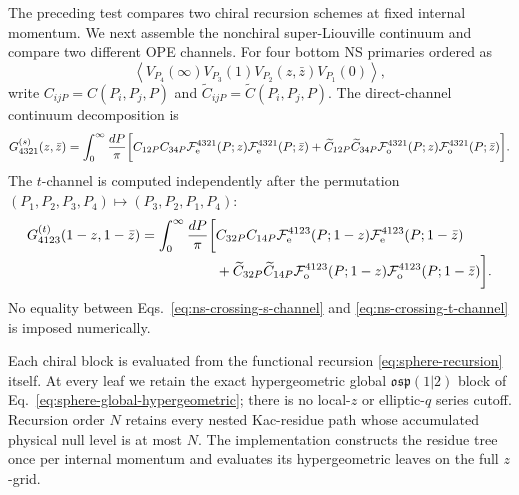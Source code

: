 \documentclass[11pt]{article}
\newcommand{\osp}{\mathfrak{osp}(1|2)}
\newcommand{\F}{\mathcal F}
\begin{document}
The preceding test compares two chiral recursion schemes at fixed internal
momentum.  We next assemble the nonchiral super-Liouville continuum and
compare two different OPE channels.  For four bottom NS primaries ordered as
\begin{equation}
 \left\langle
 V_{P_4}(\infty)V_{P_3}(1)V_{P_2}(z,\bar z)V_{P_1}(0)
 \right\rangle,
 \label{eq:ns-crossing-ordered-correlator}
\end{equation}
write \(C_{ijP}=C(P_i,P_j,P)\) and
\(\widetilde C_{ijP}=\widetilde C(P_i,P_j,P)\).  The direct-channel
continuum decomposition is
\begin{align}
 G_{4321}^{(s)}(z,\bar z)
 =\int_0^\infty\frac{dP}{\pi}\bigg[
  C_{12P}C_{34P}
  \F_{\rm e}^{4321}(P;z)\F_{\rm e}^{4321}(P;\bar z)
  +\widetilde C_{12P}\widetilde C_{34P}
  \F_{\rm o}^{4321}(P;z)\F_{\rm o}^{4321}(P;\bar z)
 \bigg].
 \label{eq:ns-crossing-s-channel}
\end{align}
The \(t\)-channel is computed independently after the permutation
\((P_1,P_2,P_3,P_4)\mapsto(P_3,P_2,P_1,P_4)\):
\begin{align}
 G_{4123}^{(t)}(1-z,1-\bar z)
 =\int_0^\infty\frac{dP}{\pi}\bigg[&
  C_{32P}C_{14P}
  \F_{\rm e}^{4123}(P;1-z)\F_{\rm e}^{4123}(P;1-\bar z)
  \nonumber\\[-0.2em]
  &+\widetilde C_{32P}\widetilde C_{14P}
  \F_{\rm o}^{4123}(P;1-z)\F_{\rm o}^{4123}(P;1-\bar z)
 \bigg].
 \label{eq:ns-crossing-t-channel}
\end{align}
No equality between Eqs.~\eqref{eq:ns-crossing-s-channel} and
\eqref{eq:ns-crossing-t-channel} is imposed numerically.

Each chiral block is evaluated from the functional recursion
\eqref{eq:sphere-recursion} itself.  At every leaf we retain the exact
hypergeometric global \(\osp\) block of
Eq.~\eqref{eq:sphere-global-hypergeometric}; there is no local-\(z\) or
elliptic-\(q\) series cutoff.  Recursion order \(N\) retains every nested
Kac-residue path whose accumulated physical null level is at most \(N\).
The implementation constructs the residue tree once per internal momentum
and evaluates its hypergeometric leaves on the full \(z\)-grid.
\end{document}
